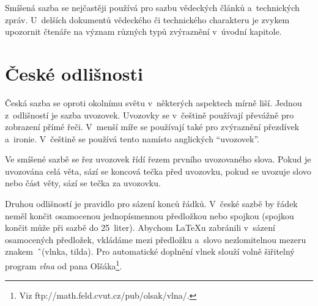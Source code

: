 \documentclass[a4paper, 11pt, twocolumn]{article}
\begin{document}
Smíšená sazba se nejčastěji používá pro sazbu vědeckých článků a~technických zpráv. U~delších dokumentů vědeckého či technického charakteru je zvykem upozornit čtenáře na význam různých typů zvýraznění v~úvodní kapitole.

\section{České odlišnosti}

Česká sazba se oproti okolnímu světu v~některých aspektech mírně liší. Jednou z~odlišností je sazba uvozovek. Uvozovky se v~češtině používají převážně pro zobrazení přímé řeči. V~menší míře se používají také pro zvýraznění přezdívek a~ironie. V~češtině se používá tento  namísto anglických ``uvozovek''.

Ve smíšené sazbě se řez uvozovek řídí řezem prvního uvozovaného slova. Pokud je uvozována celá věta, sází se koncová tečka před uvozovku, pokud se uvozuje slovo nebo část věty, sází se tečka za uvozovku.

Druhou odlišností je pravidlo pro sázení konců řádků. V~české sazbě by řádek neměl končit osamocenou jednopísmennou předložkou nebo spojkou (spojkou  končit může při sazbě do 25~liter). Abychom {\LaTeX}u zabránili v~sázení osamocených předložek, vkládáme mezi předložku a~slovo nezlomitelnou mezeru znakem\ \~\ (vlnka, tilda). Pro automatické doplnění vlnek slouží volně šiřitelný program \emph{vlna} od pana Olšáka\footnote{Viz ftp://math.feld.cvut.cz/pub/olsak/vlna/.}.
\end{document}
